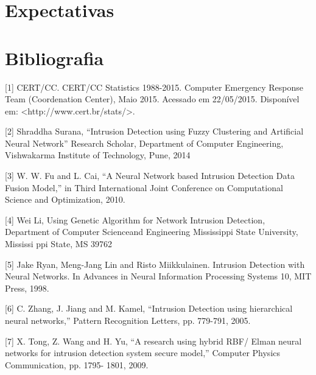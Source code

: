 \documentclass[
	12pt,				%
	openright,			%
	oneside,
	a4paper,			%
	english,			%
	french,				%
	spanish,			%
	brazil				%
	]{abntex2}
\begin{document}
\chapter[Expectativas]{Expectativas}



\postextual

\chapter[Bibliografia]{Bibliografia}

%
[1] CERT/CC. CERT/CC Statistics 1988-2015. Computer Emergency Response
Team (Coordenation Center), Maio 2015. Acessado em 22/05/2015. Disponível
em: <http://www.cert.br/stats/>.

[2] Shraddha Surana, “Intrusion Detection using Fuzzy Clustering and Artificial Neural Network” Research Scholar, Department of Computer Engineering, Vishwakarma Institute of Technology, Pune, 2014

[3] W. W. Fu and L. Cai, “A Neural Network based Intrusion Detection Data Fusion Model,” in Third International Joint Conference on Computational Science and Optimization, 2010. 

[4] Wei Li, Using Genetic Algorithm for Network Intrusion Detection, Department of Computer Scienceand Engineering Mississippi State University, Mississi ppi State, MS 39762 

[5] Jake Ryan, Meng-Jang Lin and Risto Miikkulainen. Intrusion Detection with Neural
Networks. In Advances in Neural Information Processing Systems 10, MIT Press, 1998.


[6] C. Zhang, J. Jiang and M. Kamel, “Intrusion
Detection using hierarchical neural
networks,” Pattern Recognition Letters, pp.
779-791, 2005.

[7] X. Tong, Z. Wang and H. Yu, “A research
using hybrid RBF/ Elman neural networks for
intrusion detection system secure model,”
Computer Physics Communication, pp. 1795-
1801, 2009.
\end{document}

